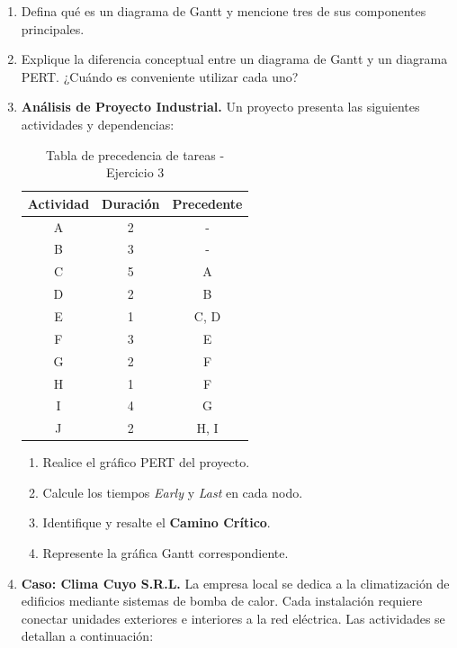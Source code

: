 \documentclass[../main]{subfiles}
\begin{document}
\begin{enumerate}
    \item Defina qué es un diagrama de Gantt y mencione tres de sus componentes principales.
    \item Explique la diferencia conceptual entre un diagrama de Gantt y un diagrama PERT. ¿Cuándo es conveniente utilizar cada uno?
    
    \item \textbf{Análisis de Proyecto Industrial.}
    Un proyecto presenta las siguientes actividades y dependencias:
    
    \begin{table}[h!]
        \centering
        \begin{tabular}{|c|c|c|} \hline
            \textbf{Actividad} & \textbf{Duración} & \textbf{Precedente} \\ \hline \hline 
            A & 2 & - \\
            B & 3 & - \\
            C & 5 & A \\
            D & 2 & B \\
            E & 1 & C, D \\
            F & 3 & E \\
            G & 2 & F \\
            H & 1 & F \\
            I & 4 & G \\
            J & 2 & H, I \\ \hline
        \end{tabular}
        \caption{Tabla de precedencia de tareas - Ejercicio 3}
        \label{tab:ejercicio_3}
    \end{table}
    
    \begin{enumerate}
        \item Realice el gráfico PERT del proyecto.
        \item Calcule los tiempos \textit{Early} y \textit{Last} en cada nodo.
        \item Identifique y resalte el \textbf{Camino Crítico}.
        \item Represente la gráfica Gantt correspondiente.
    \end{enumerate}

    \item \textbf{Caso: Clima Cuyo S.R.L.}
    La empresa local se dedica a la climatización de edificios mediante sistemas de bomba de calor. Cada instalación requiere conectar unidades exteriores e interiores a la red eléctrica. Las actividades se detallan a continuación:


\end{enumerate}
\end{document}
